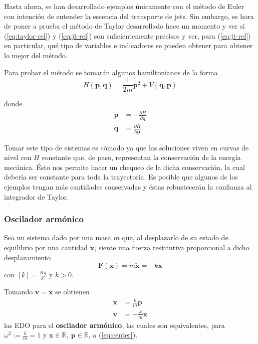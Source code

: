 Hasta ahora, se han desarrollado ejemplos únicamente con el método de Euler con intención de entender la escencia del transporte de jets. Sin embargo, es hora de poner a prueba el método de Taylor desarrollado hace un momento y ver si (\ref{eq:taylor-rel}) y (\ref{eq:jt-rel}) son suficientemente precisos y ver, para (\ref{eq:jt-rel}) en particular, qué tipo de variables e indicadores se pueden obtener para obtener lo mejor del método.

Para probar el método se tomarán algunos hamiltonianos de la forma
\begin{equation}
 H(\mathbf{p},\mathbf{q}) = \frac{1}{2m}\mathbf{p}^2 + V(\mathbf{q},\mathbf{p})
 \label{eq:hamiltonian}
\end{equation}

donde
\begin{align}
 \dot{\mathbf{p}} &= -\frac{\partial{H}}{\partial{\mathbf{q}}} \nonumber \\
 \dot{\mathbf{q}} &= \frac{\partial{H}}{\partial{\mathbf{p}}}.
\label{eq:ham-rel}
\end{align}

Tomar este tipo de sistemas es cómodo ya que las soluciones viven en curvas de nivel con $H$ constante que, de paso, representan la conservación de la energía mecánica. Ésto nos permite hacer un chequeo de la dicha conservación, la cual debería ser constante para toda la trayectoria. Es posible que algunos de los ejemplos tengan más cantidades conservadas y éstas robustecerán la confianza al integrador de Taylor.

\subsubsection{Oscilador armónico}
\label{sec:oscilador}
Sea un sistema dado por una masa $m$ que, al desplazarlo de su estado de equilibrio por una cantidad $\mathbf{x}$, siente una fuerza restitutiva proporcional a dicho desplazamiento
\begin{equation}
 \mathbf{F}(\mathbf{x}) = m \ddot{\mathbf{x}} = - k\mathbf{x}
 \label{eq:oscilador_force}
\end{equation}
con $[k] = \frac{Kg}{s^2}$  y $k>0$. 

Tomando $\mathbf{v} = \dot{\mathbf{x}}$ se obtienen
\begin{align}
 \dot{\mathbf{x}} &= \frac{k}{m} \mathbf{p} \nonumber \\
 \dot{\mathbf{v}} &= - \frac{k}{m} \mathbf{x}
 \label{eq:oscilador_ode}
\end{align}
las EDO para el \textbf{oscilador armónico}, las cuales son equivalentes, para $\omega^2 := \frac{k}{m} = 1$ y $\mathbf{x} \in \mathbb{R},\ \mathbf{p} \in \mathbb{R}$, a (\ref{eq:center}). 

